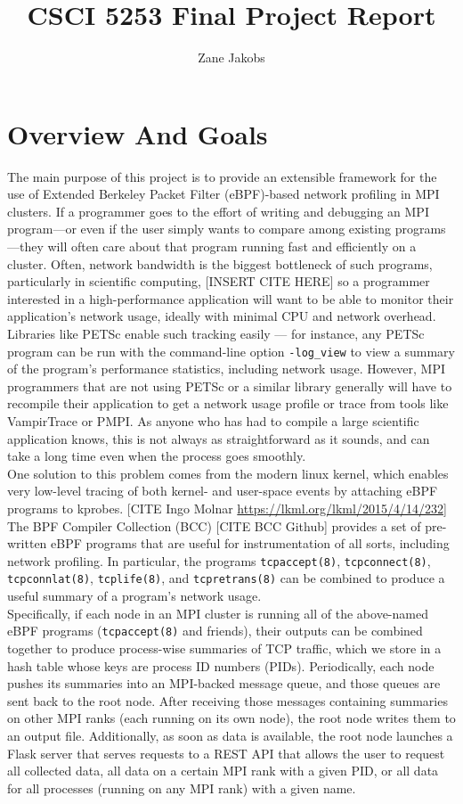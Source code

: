 \documentclass[11pt]{article}
\title{CSCI 5253 Final Project Report}
\author{Zane Jakobs}
\begin{document}
\maketitle

\section{Overview And Goals}
The main purpose of this project is to provide an extensible framework for the use of Extended Berkeley Packet Filter (eBPF)-based network profiling in MPI clusters. If a programmer goes to the effort of writing and debugging an MPI program---or even if the user simply wants to compare among existing programs---they will often care about that program running fast and efficiently on a cluster. Often, network bandwidth is the biggest bottleneck of such programs, particularly in scientific computing, [INSERT CITE HERE] so a programmer interested in a high-performance application will want to be able to monitor their application's network usage, ideally with minimal CPU and network overhead. Libraries like PETSc enable such tracking easily --- for instance, any PETSc program can be run with the command-line option \lstinline{-log_view} to view a summary of the program's performance statistics, including network usage. However, MPI programmers that are not using PETSc or a similar library generally will have to recompile their application to get a network usage profile or trace from tools like VampirTrace or PMPI. As anyone who has had to compile a large scientific application knows, this is not always as straightforward as it sounds, and can take a long time even when the process goes smoothly. \\
One solution to this problem comes from the modern linux kernel, which enables very low-level tracing of both kernel- and user-space events by attaching eBPF programs to kprobes. [CITE Ingo Molnar \url{https://lkml.org/lkml/2015/4/14/232}] The BPF Compiler Collection (BCC) [CITE BCC Github] provides a set of pre-written eBPF programs that are useful for instrumentation of all sorts, including network profiling. In particular, the programs \lstinline{tcpaccept(8)}, \lstinline{tcpconnect(8)}, \lstinline{tcpconnlat(8)}, \lstinline{tcplife(8)}, and \lstinline{tcpretrans(8)} can be combined to produce a useful summary of a program's network usage. \\
Specifically, if each node in an MPI cluster is running all of the above-named eBPF programs (\lstinline{tcpaccept(8)} and friends), their outputs can be combined together to produce process-wise summaries of TCP traffic, which we store in a hash table whose keys are process ID numbers (PIDs). Periodically, each node pushes its summaries into an MPI-backed message queue, and those queues are sent back to the root node. After receiving those messages containing summaries on other MPI ranks (each running on its own node), the root node writes them to an output file. Additionally, as soon as data is available, the root node launches a Flask server that serves requests to a REST API that allows the user to request all collected data, all data on a certain MPI rank with a given PID, or all data for all processes (running on any MPI rank) with a given name.
\end{document}
